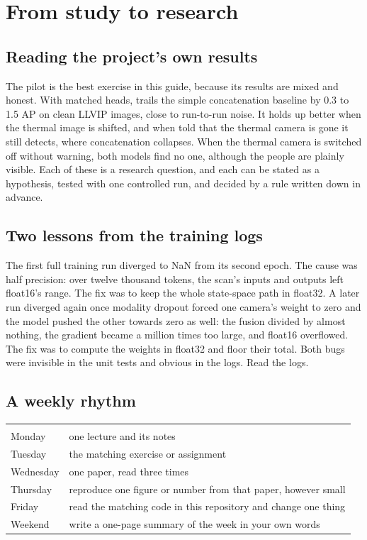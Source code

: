 \chapter{From study to research}
\label{ch:research}

\section{Reading the project's own results}

The pilot is the best exercise in this guide, because its results are mixed and honest. With matched heads,
\method{} trails the simple concatenation baseline by 0.3 to 1.5 AP on clean LLVIP images, close to run-to-run
noise. It holds up better when the thermal image is shifted, and when told that the thermal camera is gone it
still detects, where concatenation collapses. When the thermal camera is switched off without warning, both
models find no one, although the people are plainly visible. Each of these is a research question, and each
can be stated as a hypothesis, tested with one controlled run, and decided by a rule written down in advance.

\section{Two lessons from the training logs}

The first full training run diverged to NaN from its second epoch. The cause was half precision: over twelve
thousand tokens, the scan's inputs and outputs left float16's range. The fix was to keep the whole state-space
path in float32. A later run diverged again once modality dropout forced one camera's weight to zero and the
model pushed the other towards zero as well: the fusion divided by almost nothing, the gradient became a million
times too large, and float16 overflowed. The fix was to compute the weights in float32 and floor their total.
Both bugs were invisible in the unit tests and obvious in the logs. Read the logs.

\section{A weekly rhythm}

\begin{tabularx}{\textwidth}{@{}P{3cm}L@{}}
 &  \\
Monday & one lecture and its notes \\
Tuesday & the matching exercise or assignment \\
Wednesday & one paper, read three times \\
Thursday & reproduce one figure or number from that paper, however small \\
Friday & read the matching code in this repository and change one thing \\
Weekend & write a one-page summary of the week in your own words \\
\end{tabularx}

